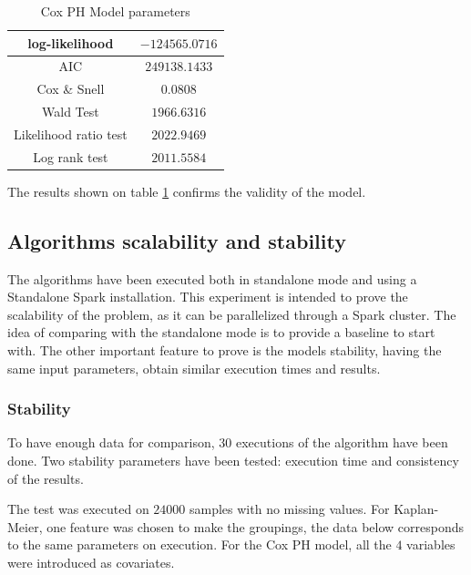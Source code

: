 \documentclass[11pt]{book} %
\begin{document}
        \begin{table}[!ht]
          \centering
          \begin{tabular}{|c|c|}
          \hline
            log-likelihood & $-124565.0716$ \\ \hline
            AIC & $249138.1433$ \\ \hline
            Cox \& Snell & $0.0808$ \\ \hline
            Wald Test & $1966.6316$ \\ \hline
            Likelihood ratio test & $2022.9469$ \\ \hline
            Log rank test & $2011.5584$ \\ \hline
          \end{tabular}
          \caption{Cox PH Model parameters}
          \label{tab:cox-model-parameters}
        \end{table}

        The results shown on table \ref{tab:cox-model-parameters} confirms the validity of the model.


    \subsection{Algorithms scalability and stability}

      The algorithms have been executed both in standalone mode and using a Standalone Spark installation. This experiment is intended to prove the scalability of the problem, as it can be parallelized through a Spark cluster. The idea of comparing with the standalone mode is to provide a baseline to start with. The other important feature to prove is the models stability, having the same input parameters, obtain similar execution times and results.

      \subsubsection{Stability}

        To have enough data for comparison, $30$ executions of the algorithm have been done. Two stability parameters have been tested: execution time and consistency of the results.

        The test was executed on $24000$ samples with no missing values. For Kaplan-Meier, one feature was chosen to make the groupings, the data below corresponds to the same parameters on execution. For the Cox PH model, all the $4$ variables were introduced as covariates.
\end{document}

